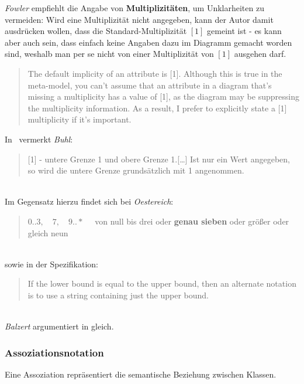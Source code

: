 \vspace{2mm}
\begin{tcolorbox}[title=Fehlende Angaben zur Multiplizität]
    \textit{Fowler} empfiehlt die Angabe von \textbf{Multiplizitäten}, um Unklarheiten zu vermeiden: Wird eine Multiplizität nicht angegeben, kann der Autor damit ausdrücken wollen, dass die Standard-Multiplizität $[1]$ gemeint ist - es kann aber auch sein, dass einfach keine Angaben dazu im Diagramm gemacht worden sind, weshalb man per se nicht von einer Multiplizität von $[1]$ ausgehen darf.
    \blockquote[{\cite[39]{Fow03b}}]{
        The default implicity of an attribute is [1]. Although this is true in the meta-model, you can't assume that an attribute in a diagram that's missing a multiplicity has a value of [1], as the diagram may be suppressing the multiplicity information. As a result, I prefer to explicitly state a [1] multiplicity if it's important.
    }
\end{tcolorbox}
\vspace{2mm}

\begin{tcolorbox}[title=Nur ein Wert $n > 1$ bei der Multiplizität,colback=red!20]
    In~\cite[19]{Buh09} vermerkt \textit{Buhl}:
    \blockquote{
    [1] - untere Grenze 1 und obere Grenze 1.[\ldots] Ist nur ein Wert angegeben, so wird die untere Grenze grundsätzlich mit 1 angenommen.
    }\\

    \noindent
    Im Gegensatz hierzu findet sich bei \textit{Oestereich}:\\
    \blockquote[{\cite[274, Hervorhebung eigene]{Oes05}}]{
        $0..3,\quad 7,\quad 9..*\quad$ von null bis drei oder \textbf{genau sieben} oder größer oder gleich neun
    }\\
    sowie in der Spezifikation:\\
    \blockquote[{\cite[35]{OMG17}}]{
        If the lower bound is equal to the upper bound, then an alternate notation is to use a string containing just the upper
        bound.
    }\\
    \textit{Balzert} argumentiert in \cite[43]{Bal05} gleich.
\end{tcolorbox}

\subsubsection*{Assoziationsnotation}

\begin{tcolorbox}
    Eine Assoziation repräsentiert die semantische Beziehung zwischen Klassen.
\end{tcolorbox}

